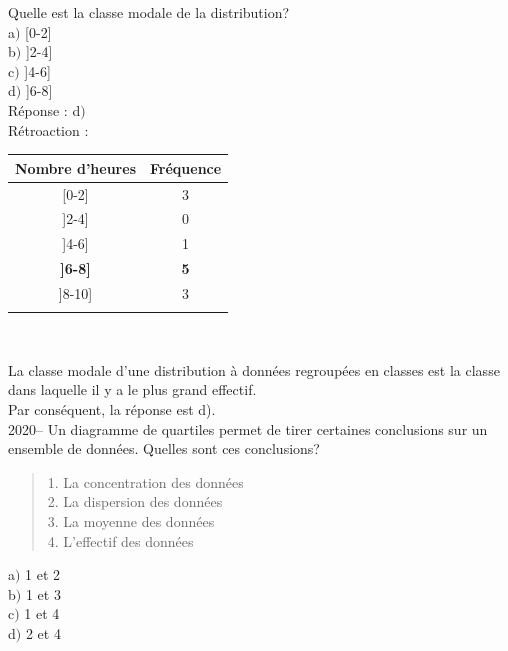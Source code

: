 \documentclass[letterpaper, 12pt]{article}
\begin{document}
Quelle est la classe modale de la distribution?\\

a$)$ [0-2]\\ [2mm]
b$)$ ]2-4]\\[2mm]
c$)$ ]4-6]\\[2mm]
d$)$ ]6-8]\\

R\'eponse : d$)$\\

R\'etroaction :\\
\begin{center}
 \begin{tabular}{|c|c|} \hline
{\bf Nombre d'heures} & {\bf Fr\'equence}  \\ \hline \hline

[0-2] & 3 \\ \hline
]2-4] & 0 \\ \hline
]4-6] & 1 \\ \hline
\textbf{]6-8]} & \textbf{5} \\ \hline
]8-10] & 3 \\ \hline
\multicolumn{2}{c}{}\\
\end{tabular}\\
\end{center}
La classe modale d'une distribution \`a donn\'ees regroup\'ees en classes est la classe dans laquelle il y a le plus grand effectif.\\
Par cons\'equent, la r\'eponse est d).\\


2020-- Un diagramme de quartiles permet de tirer certaines conclusions sur un ensemble de donn\'ees. Quelles sont ces conclusions? \\

\begin{quote}
1. La concentration des donn\'ees \\
2. La dispersion des donn\'ees\\
3. La moyenne des donn\'ees\\
4. L'effectif des donn\'ees\\
\end{quote}

a$)$ 1 et 2\\
b$)$ 1 et 3\\
c$)$ 1 et 4\\
d$)$ 2 et 4\\
\end{document}
